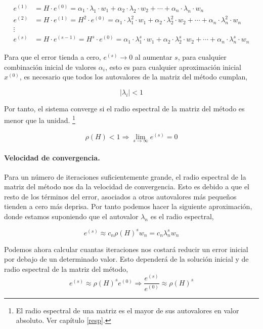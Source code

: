 \begin{align*}
e^{(1)}&=H\cdot e^{(0)}=\alpha_1\cdot \lambda_1 \cdot  w_1+\alpha_2\cdot \lambda_2 \cdot  w_2+\cdots+\alpha_n\cdot \lambda_n \cdot w_n\\
e^{(2)}&=H\cdot e^{(1)}=H^2\cdot e^{(0)}=\alpha_1\cdot \lambda_1^2 \cdot  w_1+\alpha_2\cdot \lambda_2^2 \cdot  w_2+\cdots+\alpha_n\cdot \lambda_n^2 \cdot w_n\\
\vdots \ \ \ & \\
e^{(s)}&=H\cdot e^{(s-1)}=H^s\cdot e^{(0)}=\alpha_1\cdot \lambda_1^s \cdot  w_1+\alpha_2\cdot \lambda_2^s \cdot  w_2+\cdots+\alpha_n\cdot \lambda_n^s \cdot w_n
\end{align*}

Para que el error tienda a cero, $e^{(s)}\rightarrow 0$ al aumentar $s$, para cualquier combinación inicial de valores $\alpha_i$, esto es para cualquier aproximación inicial $x^{(0)}$, es necesario que todos los autovalores de la matriz del método cumplan,

\begin{equation*}
\vert \lambda_i \vert < 1
\end{equation*}

Por tanto, el sistema converge si el radio espectral de la matriz del método es menor que la unidad. \footnote{El radio espectral de una matriz es el mayor de sus autovalores en valor absoluto. Ver capítulo \ref{resp}.}

\begin{equation*}
\rho(H)<1 \Rightarrow \lim_{s\rightarrow \infty}e^{(s)}=0
\end{equation*}

\paragraph{Velocidad de convergencia.} Para un número de iteraciones suficientemente grande, el radio espectral de la matriz del método nos da la velocidad de convergencia. Esto es debido a que el resto de los términos del error, asociados a otros autovalores más pequeños tienden a cero más  deprisa. Por tanto podemos hacer la siguiente aproximación, donde estamos suponiendo que el autovalor $\lambda_n$ es el radio espectral,

\begin{equation*}
e^{(s)}\approx c_n \rho(H)^s w_n= c_n \lambda_n^s w_n
\end{equation*}

Podemos ahora calcular cuantas iteraciones nos costará reducir un error inicial por debajo de un determinado valor. Esto dependerá de la solución inicial y de radio espectral de la matriz del método,
\begin{equation*}
e^{(s)}\approx  \rho(H)^s e^{(0)} \Rightarrow \frac{e^{(s)}}{e^{(0)}} \approx \rho(H)^s
\end{equation*}

